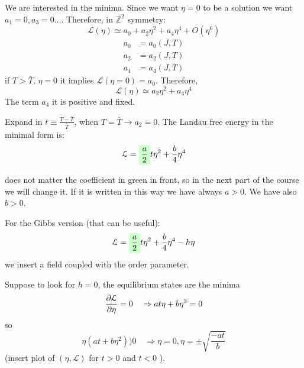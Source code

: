 \documentclass[../main/main.tex]{subfiles}
\begin{document}
We are interested in the minima.
Since we want \( \eta = 0 \) to be a solution we want \( a_1 = 0,a_3= 0 \dots \).
Therefore, in \( \mathbb{Z}^2 \) symmetry:
\begin{equation}
  \mathcal{L} (\eta ) \simeq a_0 + a_2 \eta  ^2 + a_4  \eta  ^4 + O(\eta ^6)
\end{equation}
\begin{subequations}
\begin{align}
  a_0 &= a_0 (J,T) \\
  a_2 &= a_2 (J,T) \\
  a_4 &= a_4 (J,T)
\end{align}
\end{subequations}
if \( T > \bar{T}  \), \( \eta =0 \) it implies \( \mathcal{L} (\eta = 0) = a_0 \). Therefore,
\begin{equation}
    \mathcal{L} (\eta ) \simeq  a_2 \eta  ^2 + a_4  \eta  ^4
\end{equation}
The term \( a_4 \) it is positive and fixed.

Expand in \( t \equiv \frac{T - \bar{T} }{\bar{T} } \), when \( T = \bar{T} \rightarrow a_2 = 0 \).
The Landau free energy in the minimal form is:
\begin{equation}
  \mathcal{L} =  \mathcolorbox{green!20}{\frac{a}{2}} t \eta ^2 + \frac{b}{4} \eta ^4
\end{equation}
\begin{remark}
does not matter the coefficient in green in front, so in the next part of the course we will change it. If it is written in this way we have always \( a>0 \). We have also \( b>0 \).
\end{remark}
For the Gibbs version (that can be useful):
\begin{equation}
  \mathcal{L} =  \mathcolorbox{green!20}{\frac{a}{2}} t \eta ^2 + \frac{b}{4} \eta ^4 - h \eta
\end{equation}
we insert a field coupled with the order parameter.

Suppose to look for \( h=0 \), the equilibrium states are the minima
\begin{equation}
  \pdv{\mathcal{L}}{\eta } = 0 \quad \Rightarrow  a t \eta + b \eta ^3 = 0
\end{equation}
so
\begin{equation}
  \eta (at+b \eta ^2) ) 0 \quad \Rightarrow \eta =0, \eta = \pm \sqrt{\frac{-at}{b}}
\end{equation}
(insert plot of \( (\eta,\mathcal{L}) \) for \( t>0 \)  and \( t<0 \) ).
\end{document}
